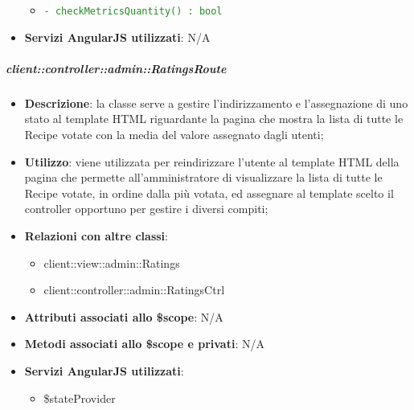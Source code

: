 \begin{itemize}
\begin{itemize}
						\item \textcolor{forestgreen}{\texttt{- checkMetricsQuantity() : bool}}
					\end{itemize}

				\item \textbf{Servizi AngularJS utilizzati}: N/A

			\end{itemize}

		\subparagraph{client::controller::admin::RatingsRoute} %
		\label{subp:bdsm_app_client_controller_admin_ratingsroute}
			\begin{itemize}
				\item \textbf{Descrizione}: la classe serve a gestire l'indirizzamento e l'assegnazione di uno stato al template HTML riguardante la pagina che mostra la lista di tutte le Recipe votate con la media del valore assegnato dagli utenti;
				\item \textbf{Utilizzo}: viene utilizzata per reindirizzare l'utente al template HTML della pagina che permette all'amministratore di visualizzare la lista di tutte le Recipe votate, in ordine dalla più votata, ed assegnare al template scelto il controller opportuno per gestire i diversi compiti;
				\item \textbf{Relazioni con altre classi}:
					\begin{itemize}
						\item client::view::admin::Ratings
						\item client::controller::admin::RatingsCtrl
					\end{itemize}
				\item \textbf{Attributi associati allo \$scope}: N/A
				\item \textbf{Metodi associati allo \$scope e privati}: N/A
				\item \textbf{Servizi AngularJS utilizzati}:
					\begin{itemize}
						\item \$stateProvider
					\end{itemize}
			\end{itemize}

